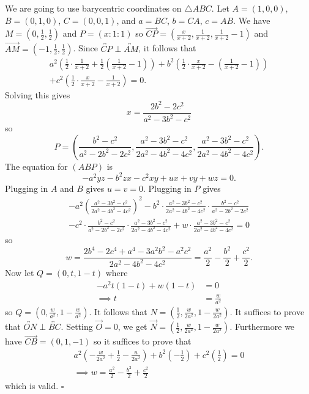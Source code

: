 \begin{enumerate}
We are going to use barycentric coordinates on $\triangle ABC$. Let $A=(1,0,0)$, $B=(0,1,0)$, $C=(0,0,1)$, and $a=BC$, $b=CA$, $c=AB$. We have $M=\left(0,\frac{1}{2},\frac{1}{2}\right)$ and $P=(x:1:1)$ so $\overrightarrow{CP}=\left(\frac{x}{x+2},\frac{1}{x+2},\frac{1}{x+2}-1\right)$ and $\overrightarrow{AM}=\left(-1,\frac{1}{2},\frac{1}{2}\right)$. Since $\overleftrightarrow{CP}\perp\overleftrightarrow{AM}$, it follows that
 \begin{align*} a^2\left(\frac{1}{2}\cdot\frac{1}{x+2}+\frac{1}{2}\left(\frac{1}{x+2}-1\right)\right)+b^2\left(\frac{1}{2}\cdot\frac{x}{x+2}-\left(\frac{1}{x+2}-1\right)\right)\\ +c^2\left(\frac{1}{2}\cdot\frac{x}{x+2}-\frac{1}{x+2}\right)=0. \end{align*}
Solving this gives
 \[ x=\frac{2b^2-2c^2}{a^2-3b^2-c^2} \]so
 \[ P=\left(\frac{b^2-c^2}{a^2-2b^2-2c^2},\frac{a^2-3b^2-c^2}{2a^2-4b^2-4c^2},\frac{a^2-3b^2-c^2}{2a^2-4b^2-4c^2}\right). \]The equation for $(ABP)$ is
 \[ -a^2yz-b^2zx-c^2xy+ux+vy+wz=0. \]Plugging in $A$ and $B$ gives $u=v=0$. Plugging in $P$ gives
 \begin{align*} -a^2\left(\frac{a^2-3b^2-c^2}{2a^2-4b^2-4c^2}\right)^2-b^2\cdot\frac{a^2-3b^2-c^2}{2a^2-4b^2-4c^2}\cdot\frac{b^2-c^2}{a^2-2b^2-2c^2}\\ -c^2\cdot\frac{b^2-c^2}{a^2-2b^2-2c^2}\cdot\frac{a^2-3b^2-c^2}{2a^2-4b^2-4c^2}+w\cdot\frac{a^2-3b^2-c^2}{2a^2-4b^2-4c^2}=0 \end{align*}
so
 \[ w=\frac{2b^4-2c^4+a^4-3a^2b^2-a^2c^2}{2a^2-4b^2-4c^2}=\frac{a^2}{2}-\frac{b^2}{2}+\frac{c^2}{2}. \]Now let $Q=(0,t,1-t)$ where
 \begin{align*} -a^2t(1-t)+w(1-t)&=0\\ \implies t&=\frac{w}{a^2} \end{align*}
so $Q=\left(0,\frac{w}{a^2},1-\frac{w}{a^2}\right)$. It follows that $N=\left(\frac{1}{2},\frac{w}{2a^2},1-\frac{w}{2a^2}\right)$. It suffices to prove that $\overleftrightarrow{ON}\perp\overleftrightarrow{BC}$. Setting $\overrightarrow{O}=0$, we get $\overrightarrow{N}=\left(\frac{1}{2},\frac{w}{2a^2},1-\frac{w}{2a^2}\right)$. Furthermore we have $\overrightarrow{CB}=(0,1,-1)$ so it suffices to prove that
 \begin{align*} a^2\left(-\frac{w}{2a^2}+\frac{1}{2}-\frac{u}{2a^2}\right)+b^2\left(-\frac{1}{2}\right)+c^2\left(\frac{1}{2}\right)=0\\ \implies w=\frac{a^2}{2}-\frac{b^2}{2}+\frac{c^2}{2} \end{align*}
which is valid. $\square$





\end{enumerate}
